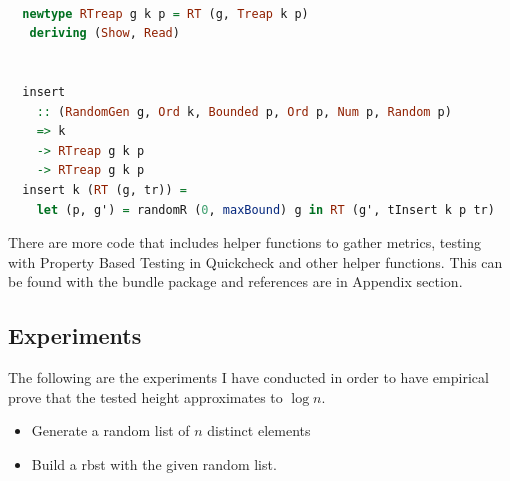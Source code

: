 \documentclass[12pt, a4paper]{article}
\begin{document}
\begin{lstlisting}[language=Haskell,title={\textbf{RandomBST.hs} - Random Treap Implementation with Insert function compose with underlying Treap}]

  newtype RTreap g k p = RT (g, Treap k p)
   deriving (Show, Read)


  insert
    :: (RandomGen g, Ord k, Bounded p, Ord p, Num p, Random p)
    => k
    -> RTreap g k p
    -> RTreap g k p
  insert k (RT (g, tr)) =
    let (p, g') = randomR (0, maxBound) g in RT (g', tInsert k p tr)

\end{lstlisting}

There are more code that includes helper functions to gather metrics, testing with Property Based Testing in Quickcheck and other helper functions. This can be found with the bundle package and references are in Appendix section.

\subsection{Experiments}
The following are the experiments I have conducted in order to have empirical prove that the tested height approximates to $\log n$.

\begin{itemize}
  \item Generate a random list of $n$ distinct elements
  \item Build a \acrshort{rbst} with the given random list.
\end{itemize}
\end{document}

